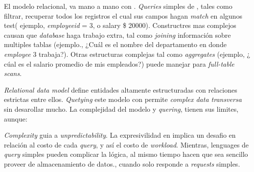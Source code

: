 El modelo relacional, va mano a mano con . \textit{Queries} simples de , tales como filtrar, recuperar todos los registros el cual sus campos hagan \textit{match} en algunos test( ejemplo, \textit{employeeid} = 3, o salary \> \$ 20000). Constructres mas complejos causan que \textit{database} haga trabajo extra, tal como \textit{joining} información sobre multiples tablas (ejemplo., ¿Cuál es el nombre del departamento en donde \textit{employee} 3 trabaja?). Otras estructuras complejas tal como \textit{aggregates} (ejemplo, ¿ cúal es el salario promedio de mis empleados?) puede manejar para \textit{full-table scans}.


\textit{Relational data model} define entidades altamente estructuradas con relaciones estrictas entre ellos. \textit{Quetying} este modelo con  permite \textit{complex data transversa} sin desarollar mucho. La complejidad del modelo y \textit{quering}, tienen sus limites, aunque:

\textit{Complexity} guia a \textit{unpredictability}. La expresivilidad en  implica un desafio en relación al costo de cada \textit{query}, y así el costo de \textit{workload}. Mientras, lenguages de \textit{query} simples pueden complicar la lógica, al mismo tiempo hacen que sea sencillo proveer de almacenamiento de datos., cuando solo responde a \textit{requests} simples.

